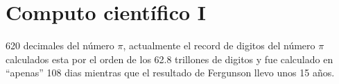 \chapter{Computo científico I} %
\label{cha:computo_cientifico_i}


\noindent {}
620 decimales del número \(\pi\), actualmente el record de digitos del
número \(\pi\) calculados esta por el orden de los 62.8 trillones de digitos y
fue calculado en ``apenas'' 108 dias mientras que el resultado de Fergunson 
llevo unos 15 años. 


